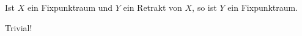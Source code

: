 \begin{exercise}

Ist $X$ ein Fixpunktraum und $Y$ ein Retrakt von $X$, so ist $Y$ ein Fixpunktraum.

\end{exercise}

\begin{solution}

Trivial!

\end{solution}
